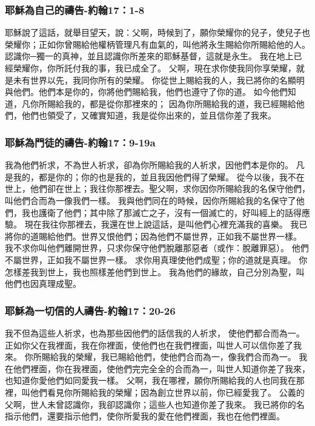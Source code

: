 \subsubsection{耶穌為自己的禱告-約翰17：1-8}
耶穌說了這話，就舉目望天，說：父啊，時候到了，願你榮耀你的兒子，使兒子也榮耀你；正如你曾賜給他權柄管理凡有血氣的，叫他將永生賜給你所賜給他的人。認識你─獨一的真神，並且認識你所差來的耶穌基督，這就是永生。
我在地上已經榮耀你，你所託付我的事，我已成全了。
父啊，現在求你使我同你享榮耀，就是未有世界以先，我同你所有的榮耀。
你從世上賜給我的人，我已將你的名顯明與他們。他們本是你的，你將他們賜給我，他們也遵守了你的道。
如今他們知道，凡你所賜給我的，都是從你那裡來的；
因為你所賜給我的道，我已經賜給他們，他們也領受了，又確實知道，我是從你出來的，並且信你差了我來。

\subsubsection{耶穌為門徒的禱告-約翰17：9-19a}
我為他們祈求，不為世人祈求，卻為你所賜給我的人祈求，因他們本是你的。
凡是我的，都是你的；你的也是我的，並且我因他們得了榮耀。
從今以後，我不在世上，他們卻在世上；我往你那裡去。聖父啊，求你因你所賜給我的名保守他們，叫他們合而為一像我們一樣。
我與他們同在的時候，因你所賜給我的名保守了他們，我也護衛了他們；其中除了那滅亡之子，沒有一個滅亡的，好叫經上的話得應驗。
現在我往你那裡去，我還在世上說這話，是叫他們心裡充滿我的喜樂。
我已將你的道賜給他們。世界又恨他們；因為他們不屬世界，正如我不屬世界一樣。
我不求你叫他們離開世界，只求你保守他們脫離那惡者（或作：脫離罪惡）。
他們不屬世界，正如我不屬世界一樣。
求你用真理使他們成聖；你的道就是真理。
你怎樣差我到世上，我也照樣差他們到世上。
我為他們的緣故，自己分別為聖，叫他們也因真理成聖。

\subsubsection{耶穌為一切信的人禱告-約翰17：20-26}
我不但為這些人祈求，也為那些因他們的話信我的人祈求，
使他們都合而為一。正如你父在我裡面，我在你裡面，使他們也在我們裡面，叫世人可以信你差了我來。
你所賜給我的榮耀，我已賜給他們，使他們合而為一，像我們合而為一。
我在他們裡面，你在我裡面，使他們完完全全的合而為一，叫世人知道你差了我來，也知道你愛他們如同愛我一樣。
父啊，我在哪裡，願你所賜給我的人也同我在那裡，叫他們看見你所賜給我的榮耀；因為創立世界以前，你已經愛我了。
公義的父啊，世人未曾認識你，我卻認識你；這些人也知道你差了我來。
我已將你的名指示他們，還要指示他們，使你所愛我的愛在他們裡面，我也在他們裡面。

















